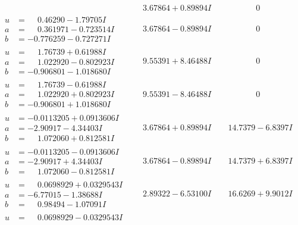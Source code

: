 \documentclass[1p]{elsarticle_modified}
\theoremstyle{definition}
\begin{document}
$$\begin{array}{c|c|c}
 & \phantom{-}3.67864 + 0.89894 I & \phantom{-0.000000 } 0 \\ \hline\begin{aligned}
u &= \phantom{-}0.46290 - 1.79705 I \\
a &= \phantom{-}0.361971 - 0.723514 I \\
b &= -0.776259 - 0.727271 I\end{aligned}
 & \phantom{-}3.67864 - 0.89894 I & \phantom{-0.000000 } 0 \\ \hline\begin{aligned}
u &= \phantom{-}1.76739 + 0.61988 I \\
a &= \phantom{-}1.022920 - 0.802923 I \\
b &= -0.906801 - 1.018680 I\end{aligned}
 & \phantom{-}9.55391 + 8.46488 I & \phantom{-0.000000 } 0 \\ \hline\begin{aligned}
u &= \phantom{-}1.76739 - 0.61988 I \\
a &= \phantom{-}1.022920 + 0.802923 I \\
b &= -0.906801 + 1.018680 I\end{aligned}
 & \phantom{-}9.55391 - 8.46488 I & \phantom{-0.000000 } 0 \\ \hline\begin{aligned}
u &= -0.0113205 + 0.0913606 I \\
a &= -2.90917 - 4.34403 I \\
b &= \phantom{-}1.072060 + 0.812581 I\end{aligned}
 & \phantom{-}3.67864 + 0.89894 I & \phantom{-}14.7379 - 6.8397 I \\ \hline\begin{aligned}
u &= -0.0113205 - 0.0913606 I \\
a &= -2.90917 + 4.34403 I \\
b &= \phantom{-}1.072060 - 0.812581 I\end{aligned}
 & \phantom{-}3.67864 - 0.89894 I & \phantom{-}14.7379 + 6.8397 I \\ \hline\begin{aligned}
u &= \phantom{-}0.0698929 + 0.0329543 I \\
a &= -6.77015 - 1.38688 I \\
b &= \phantom{-}0.98494 - 1.07091 I\end{aligned}
 & \phantom{-}2.89322 - 6.53100 I & \phantom{-}16.6269 + 9.9012 I \\ \hline\begin{aligned}
u &= \phantom{-}0.0698929 - 0.0329543 I \\

\end{aligned}
\end{array}$$
\end{document}
